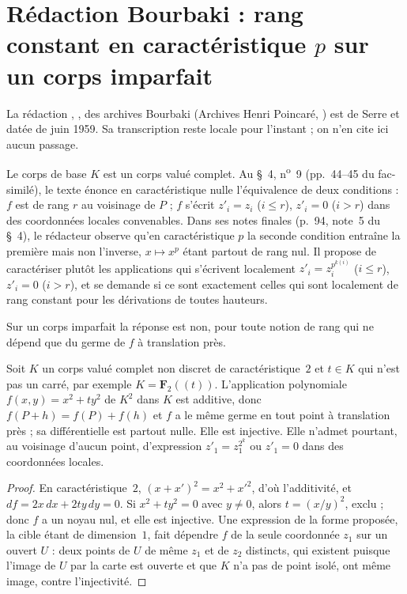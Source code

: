 \section[Rédaction Bourbaki \redac{324} : rang constant en caractéristique $p$]{Rédaction Bourbaki  : rang constant en caractéristique $p$ sur un corps imparfait\protect\piste\protect{}}\label{sec:bourbaki-324}

La rédaction , , des archives Bourbaki (Archives Henri Poincaré, ) est de Serre et datée de juin 1959. Sa transcription reste locale pour l'instant ; on n'en cite ici aucun passage.

Le corps de base $K$ est un corps valué complet. Au §~4, n\textsuperscript{o}~9 (pp.~44--45 du fac-similé), le texte énonce en caractéristique nulle l'équivalence de deux conditions : $f$ est de rang $r$ au voisinage de $P$ ; $f$ s'écrit $z'_i = z_i$ ($i \le r$), $z'_i = 0$ ($i > r$) dans des coordonnées locales convenables. Dans ses notes finales (p.~94, note~5 du §~4), le rédacteur observe qu'en caractéristique $p$ la seconde condition entraîne la première mais non l'inverse, $x \mapsto x^p$ étant partout de rang nul. Il propose de caractériser plutôt les applications qui s'écrivent localement $z'_i = z_i^{p^{k(i)}}$ ($i \le r$), $z'_i = 0$ ($i > r$), et se demande si ce sont exactement celles qui sont localement de rang constant pour les dérivations de toutes hauteurs.

Sur un corps imparfait la réponse est non, pour toute notion de rang qui ne dépend que du germe de $f$ à translation près.

\begin{encadre}
\begin{contrexemple}\mbox{}
Soit $K$ un corps valué complet non discret de caractéristique~$2$ et $t \in K$ qui n'est pas un carré, par exemple $K = \mathbf F_2(\!(t)\!)$. L'application polynomiale $f(x, y) = x^2 + t y^2$ de $K^2$ dans $K$ est additive, donc $f(P + h) = f(P) + f(h)$ et $f$ a le même germe en tout point à translation près ; sa différentielle est partout nulle. Elle est injective. Elle n'admet pourtant, au voisinage d'aucun point, d'expression $z'_1 = z_1^{2^k}$ ou $z'_1 = 0$ dans des coordonnées locales.
\end{contrexemple}
\end{encadre}

\begin{proof}
En caractéristique~$2$, $(x + x')^2 = x^2 + x'^2$, d'où l'additivité, et $d f = 2x\,dx + 2ty\,dy = 0$. Si $x^2 + t y^2 = 0$ avec $y \ne 0$, alors $t = (x/y)^2$, exclu ; donc $f$ a un noyau nul, et elle est injective. Une expression de la forme proposée, la cible étant de dimension~$1$, fait dépendre $f$ de la seule coordonnée $z_1$ sur un ouvert $U$ : deux points de $U$ de même $z_1$ et de $z_2$ distincts, qui existent puisque l'image de $U$ par la carte est ouverte et que $K$ n'a pas de point isolé, ont même image, contre l'injectivité.
\end{proof}

